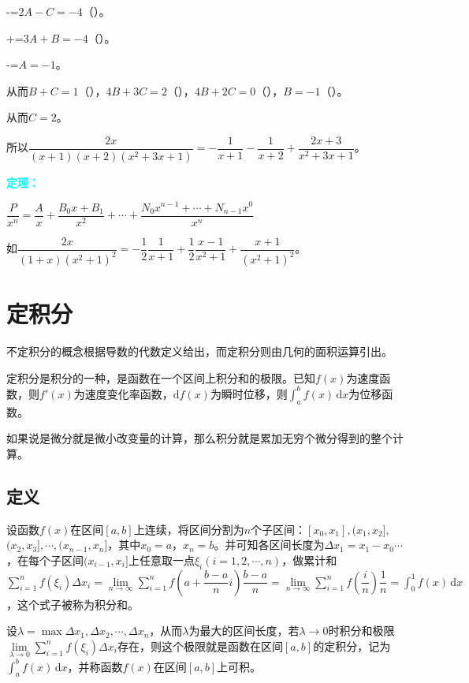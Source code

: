 \documentclass[UTF8, 12pt]{ctexart}
\begin{document}
        -=$2A-C=-4$（）。

        +=$3A+B=-4$（）。

        -=$A=-1$。

        从而$B+C=1$（），$4B+3C=2$（），$4B+2C=0$（），$B=-1$（）。

        从而$C=2$。

        所以$\dfrac{2x}{(x+1)(x+2)(x^2+3x+1)}=-\dfrac{1}{x+1}-\dfrac{1}{x+2}+\dfrac{2x+3}{x^2+3x+1}$。\medskip

        \textcolor{aqua}{\textbf{定理：}}

        $\dfrac{P}{x^n}=\dfrac{A}{x}+\dfrac{B_0x+B_1}{x^2}+\cdots+\dfrac{N_0x^{n-1}+\cdots+N_{n-1}x^0}{x^n}$ \medskip

        如$\dfrac{2x}{(1+x)(x^2+1)^2}=-\dfrac{1}{2}\dfrac{1}{x+1}+\dfrac{1}{2}\dfrac{x-1}{x^2+1}+\dfrac{x+1}{(x^2+1)^2}$。

        \section{定积分}

        不定积分的概念根据导数的代数定义给出，而定积分则由几何的面积运算引出。

        定积分是积分的一种，是函数在一个区间上积分和的极限。已知$f(x)$为速度函数，则$f'(x)$为速度变化率函数，$\textrm{d}f(x)$为瞬时位移，则$\int_{a}^bf(x)\,\textrm{d}x$为位移函数。

        如果说是微分就是微小改变量的计算，那么积分就是累加无穷个微分得到的整个计算。

        \subsection{定义}

        设函数$f(x)$在区间$[a,b]$上连续，将区间分割为$n$个子区间：$[x_0,x_1],(x_1,x_2],$\\$(x_2,x_3],\cdots,(x_{n-1},x_n]$，其中$x_0=a$，$x_n=b$。并可知各区间长度为$\Delta x_1=x_1-x_0\cdots$，在每个子区间$(x_{i-1},x_i]$上任意取一点$\xi_i(i=1,2,\cdots,n)$，做累计和$\sum\limits_{i=1}^nf(\xi_i)\Delta x_i=\lim\limits_{n\to\infty}\sum\limits_{i=1}^nf(a+\dfrac{b-a}{n}i)\dfrac{b-a}{n}=\lim\limits_{n\to\infty}\sum\limits_{i=1}^nf(\dfrac{i}{n})\dfrac{1}{n}=\int_0^1f(x)\,\textrm{d}x$，这个式子被称为积分和。

        设$\lambda=\max{\Delta x_1,\Delta x_2,\cdots,\Delta x_n}$，从而$\lambda$为最大的区间长度，若$\lambda\to 0$时积分和极限$\lim\limits_{\lambda\to 0}\sum\limits_{i=1}^nf(\xi_i)\Delta x_i$存在，则这个极限就是函数在区间$[a,b]$的定积分，记为$\int_a^bf(x)\,\textrm{d}x$，并称函数$f(x)$在区间$[a,b]$上可积。
\end{document}
